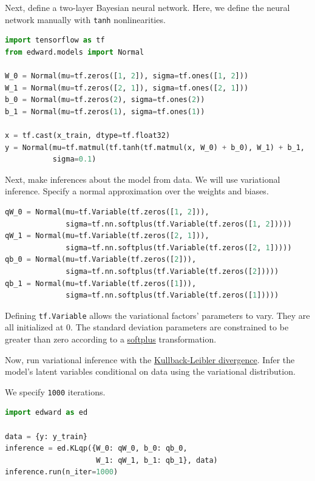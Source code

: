 Next, define a two-layer Bayesian neural network. Here, we
define the neural network manually with \texttt{tanh} nonlinearities.

\begin{lstlisting}[language=Python]
import tensorflow as tf
from edward.models import Normal

W_0 = Normal(mu=tf.zeros([1, 2]), sigma=tf.ones([1, 2]))
W_1 = Normal(mu=tf.zeros([2, 1]), sigma=tf.ones([2, 1]))
b_0 = Normal(mu=tf.zeros(2), sigma=tf.ones(2))
b_1 = Normal(mu=tf.zeros(1), sigma=tf.ones(1))

x = tf.cast(x_train, dtype=tf.float32)
y = Normal(mu=tf.matmul(tf.tanh(tf.matmul(x, W_0) + b_0), W_1) + b_1,
           sigma=0.1)
\end{lstlisting}

Next, make inferences about the model from data. We will use variational
inference. Specify a normal approximation over the weights and biases.

\begin{lstlisting}[language=Python]
qW_0 = Normal(mu=tf.Variable(tf.zeros([1, 2])),
              sigma=tf.nn.softplus(tf.Variable(tf.zeros([1, 2]))))
qW_1 = Normal(mu=tf.Variable(tf.zeros([2, 1])),
              sigma=tf.nn.softplus(tf.Variable(tf.zeros([2, 1]))))
qb_0 = Normal(mu=tf.Variable(tf.zeros([2])),
              sigma=tf.nn.softplus(tf.Variable(tf.zeros([2]))))
qb_1 = Normal(mu=tf.Variable(tf.zeros([1])),
              sigma=tf.nn.softplus(tf.Variable(tf.zeros([1]))))
\end{lstlisting}

Defining \texttt{tf.Variable} allows the variational factors'
parameters to vary. They are all initialized at 0. The standard
deviation parameters are constrained to be greater than zero according
to a
\href{https://en.wikipedia.org/wiki/Rectifier_(neural_networks)}{softplus}
transformation.

Now, run variational inference with the
\href{https://en.wikipedia.org/wiki/Kullback–Leibler_divergence}{Kullback-Leibler divergence}.
Infer the model's latent variables conditional on data using the
variational distribution.

We specify \texttt{1000} iterations.
\begin{lstlisting}[language=Python]
import edward as ed

data = {y: y_train}
inference = ed.KLqp({W_0: qW_0, b_0: qb_0,
                     W_1: qW_1, b_1: qb_1}, data)
inference.run(n_iter=1000)
\end{lstlisting}

